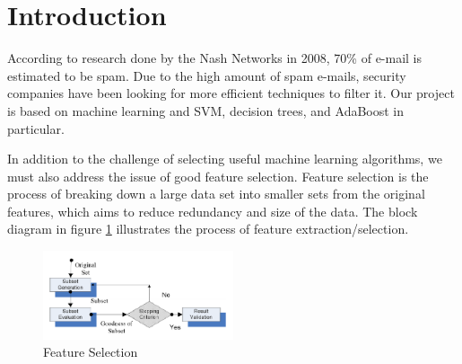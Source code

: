 \section{Introduction}
According to research done by the Nash Networks \cite{choudhary} in 2008, 70\% of e-mail is estimated to be spam. Due to the high amount of spam e-mails, security companies have been looking for more efficient techniques to filter it. 
Our project is based on machine learning and SVM, decision trees, and AdaBoost in particular.

In addition to the challenge of selecting useful machine learning algorithms, we must also address the issue of good feature selection. Feature selection is the process of breaking down a large data set into smaller sets from the original features, which aims to reduce redundancy and size of the data. The block diagram in figure \ref{fig:featureSelection} illustrates the process of feature extraction/selection.



\begin{figure}[h]
    \centering
    \includegraphics[width=0.5\textwidth]{featureSelection}
    \caption{Feature Selection}
    \label{fig:featureSelection}
\end{figure}
